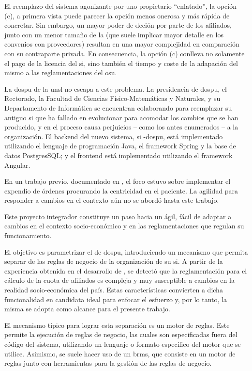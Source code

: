 El reemplazo del sistema agonizante por uno propietario ``enlatado'', la opción (c), a primera vista puede parecer la opción menos onerosa y más rápida de concretar. 
Sin embargo, un mayor poder de deción por parte de los afiliados, junto con un menor tamaño de la  (que suele implicar mayor detalle en los convenios con proveedores) resultan en una mayor complejidad en comparación con su contraparte privada. En consecuencia, la opción (c) conlleva no solamente el pago de la licencia del \acrshort{si}, sino también el tiempo y coste de la adapación del mismo a las reglamentaciones del \acrshort{osu}.

La \acrfull{dospu} de la \acrfull{unsl} no escapa a este problema. 
La presidencia de \acrshort{dospu}, el Rectorado, la Facultad de Ciencias Físico-Matemáticas y Naturales, y su Departamento de Informática se encuentran colaborando para reemplazar su antiguo \acrshort{si} que ha fallado en evolucionar para acomodar los cambios que se han producido, y en el proceso causa perjuicios – como los antes enumerados – a la organización. 
%
El backend del nuevo sistema, \acrshort{si} -\acrshort{dospu}, está implementado utilizando el lenguaje de programación Java, el framework Spring y la base de datos PostgresSQL; y el frontend está implementado utilizando el framework Angular. 

En un trabajo previo, documentado en \cite{Vela2024}, el foco estuvo sobre implementar el expendio de órdenes procurando la centricidad en el paciente.
La agilidad para responder a cambios en el contexto aún no se abordó hasta este trabajo.

Este proyecto integrador constituye un paso hacia un {\SIOSU} ágil, fácil de adaptar a cambios en el contexto socio-económico y en las reglamentaciones que regulan su funcionamiento.

El objetivo es parametrizar el {\SIOSU} de \acrshort{dospu}, introduciendo un mecanismo que permita separar de las reglas de negocio de la organización de su \acrshort{si}. 
A partir de la experiencia obtenida en el desarrollo de {\SIDOSPU}, se detectó que la reglamentación para el cálculo de la cuota de afiliados es compleja y muy susceptible a cambios en la realidad socio-económica del país. 
Estas características convierten a dicha funcionalidad en candidata ideal para enfocar el esfuerzo y, por lo tanto, la misma se adopta como alcance para el presente trabajo.

El mecanismo típico para lograr esta separación es un motor de reglas. Este permite la ejecución de reglas de negocio, las cuales son especificadas fuera del código del sistema, utilizando un lenguaje o formato específico del motor que se utilice.
Asimismo, se suele hacer uso de un \acrfull{brms}, que consiste en un motor de reglas junto con herramientas para la gestión de las reglas de negocio.

